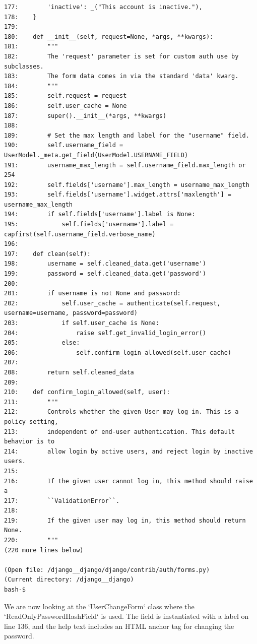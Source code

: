 {\begin{observationbox}
\begin{Verbatim}[breaklines=true, breakanywhere=true]
177:        'inactive': _("This account is inactive."),
178:    }
179:
180:    def __init__(self, request=None, *args, **kwargs):
181:        """
182:        The 'request' parameter is set for custom auth use by subclasses.
183:        The form data comes in via the standard 'data' kwarg.
184:        """
185:        self.request = request
186:        self.user_cache = None
187:        super().__init__(*args, **kwargs)
188:
189:        # Set the max length and label for the "username" field.
190:        self.username_field = UserModel._meta.get_field(UserModel.USERNAME_FIELD)
191:        username_max_length = self.username_field.max_length or 254
192:        self.fields['username'].max_length = username_max_length
193:        self.fields['username'].widget.attrs['maxlength'] = username_max_length
194:        if self.fields['username'].label is None:
195:            self.fields['username'].label = capfirst(self.username_field.verbose_name)
196:
197:    def clean(self):
198:        username = self.cleaned_data.get('username')
199:        password = self.cleaned_data.get('password')
200:
201:        if username is not None and password:
202:            self.user_cache = authenticate(self.request, username=username, password=password)
203:            if self.user_cache is None:
204:                raise self.get_invalid_login_error()
205:            else:
206:                self.confirm_login_allowed(self.user_cache)
207:
208:        return self.cleaned_data
209:
210:    def confirm_login_allowed(self, user):
211:        """
212:        Controls whether the given User may log in. This is a policy setting,
213:        independent of end-user authentication. This default behavior is to
214:        allow login by active users, and reject login by inactive users.
215:
216:        If the given user cannot log in, this method should raise a
217:        ``ValidationError``.
218:
219:        If the given user may log in, this method should return None.
220:        """
(220 more lines below)

(Open file: /django__django/django/contrib/auth/forms.py)
(Current directory: /django__django)
bash-$
\end{Verbatim}
\end{observationbox}
\begin{agentbox}
We are now looking at the `UserChangeForm` class where the `ReadOnlyPasswordHashField` is used. The field is instantiated with a label on line 136, and the help text includes an HTML anchor tag for changing the password.




\end{agentbox}}
